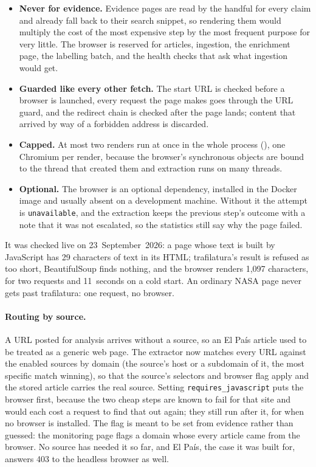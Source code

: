 \begin{itemize}
    \item \textbf{Never for evidence.} Evidence pages are read by the
    handful for every claim and already fall back to their search
    snippet, so rendering them would multiply the cost of the most
    expensive step by the most frequent purpose for very little. The
    browser is reserved for articles, ingestion, the enrichment page,
    the labelling batch, and the health checks that ask what ingestion
    would get.
    \item \textbf{Guarded like every other fetch.} The start URL is
    checked before a browser is launched, every request the page makes
    goes through the URL guard, and the redirect chain is checked after
    the page lands; content that arrived by way of a forbidden address
    is discarded.
    \item \textbf{Capped.} At most two renders run at once in the whole
    process (), one Chromium per
    render, because the browser's synchronous objects are bound to the
    thread that created them and extraction runs on many threads.
    \item \textbf{Optional.} The browser is an optional dependency,
    installed in the Docker image and usually absent on a development
    machine. Without it the attempt is \texttt{unavailable}, and the
    extraction keeps the previous step's outcome with a note that it
    was not escalated, so the statistics still say why the page failed.
\end{itemize}

It was checked live on 23~September~2026: a page whose text is built by
JavaScript has 29 characters of text in its HTML; trafilatura's result
is refused as too short, BeautifulSoup finds nothing, and the browser
renders 1,097 characters, for two requests and 11~seconds on a cold
start. An ordinary NASA page never gets past trafilatura: one request,
no browser.

\paragraph{Routing by source.} A URL posted for analysis arrives
without a source, so an El País article used to be treated as a
generic web page. The extractor now matches every URL against the
enabled sources by domain (the source's host or a subdomain of it, the
most specific match winning), so that the source's selectors and
browser flag apply and the stored article carries the real source.
Setting \texttt{requires\_javascript} puts the browser first, because
the two cheap steps are known to fail for that site and would each cost
a request to find that out again; they still run after it, for when no
browser is installed. The flag is meant to be set from evidence rather
than guessed: the monitoring page flags a domain whose every article
came from the browser. No source has needed it so far, and El País, the
case it was built for, answers 403 to the headless browser as well.


